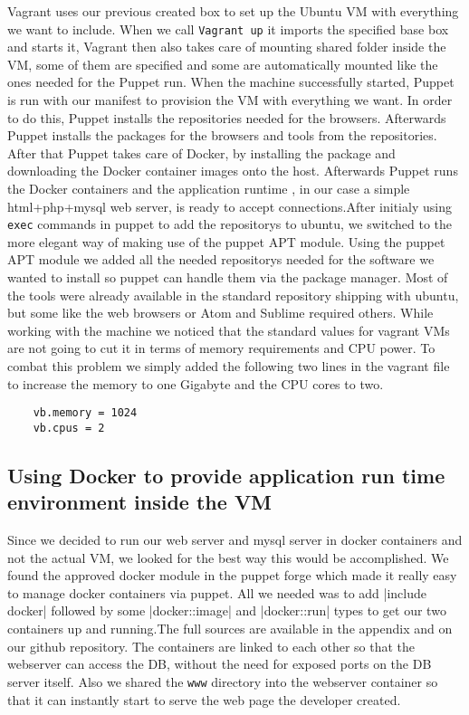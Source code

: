 Vagrant uses our previous created \gls{box} to set up the Ubuntu \gls{VM} with everything we want to include.  When we call \verb|Vagrant up| it imports the specified base \gls{box} and starts it, Vagrant then also takes care of mounting shared folder inside the \gls{VM}, some of them are specified and some are automatically mounted like the ones needed for the Puppet run. When the machine successfully started, Puppet is run with our manifest to provision the \gls{VM} with everything we want. In order to do this, Puppet installs the repositories needed for the browsers. Afterwards Puppet installs the packages for the browsers and tools from the repositories. After that Puppet takes care of Docker, by installing the package and downloading the Docker container images onto the host. Afterwards Puppet runs the Docker containers and the application runtime , in our case a simple html+php+mysql web server, is ready to accept connections.After initialy using \verb|exec|  commands in puppet to add the repositorys to ubuntu, we switched to the more elegant way of making use of the puppet APT module. Using the puppet APT module we added all the needed \glspl{repository} needed for the software we wanted to install so puppet can handle them via the package manager. Most of the tools were already available in the standard \gls{repository} shipping with ubuntu, but some like the web browsers or Atom and Sublime required others.
While working with the machine we noticed that the standard values for vagrant \glspl{VM} are not going to cut it in terms of memory requirements and CPU power. To combat this problem we simply added the following two lines in the vagrant file to increase the memory to one Gigabyte and the CPU cores to two.

\begin{verbatim}
	vb.memory = 1024
	vb.cpus = 2
\end{verbatim}

\subsection{Using Docker to provide application run time environment inside the \gls{VM}}
Since we decided to run our web server and mysql server in docker containers and not the actual \gls{VM}, we looked for the best way this would be accomplished. We found the approved docker module in the puppet forge which made it really easy to manage docker containers via puppet. All we needed was to add |include docker| followed by some |docker::image| and |docker::run| types to get our two containers up and running.The full sources are available in the appendix and on our github repository. The containers are linked to each other so that the webserver can access the DB, without the need for exposed ports on the DB server itself. Also we shared the \verb|www| directory into the webserver container so that it can instantly start to serve the web page the developer created.

